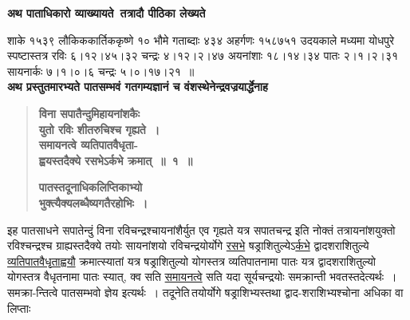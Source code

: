 \documentclass[11pt, openany]{book}
\begin{document}
{\small \textbf{अथ पाताधिकारो व्याख्यायते\textendash ~तत्रादौ पीठिका लेख्यते\textendash }}

\newpage

\begin{sloppypar}
शाके १५३९ लौकिककार्तिककृष्णे १० भौमे गताब्दाः ४३४ अहर्गणः १५८७५१ उदयकाले मध्यमा योधपुरे स्पष्टास्तत्र रविः ६।१२।४५।३२ चन्द्रः ४।१२।२।४७ अयनांशाः १८।१४।३४ पातः २।१।२।३१ सायनार्कः ७।१।०।६ चन्द्रः ५।०।१७।२१~॥\\

{\small \textbf{अथ प्रस्तुतमारभ्यते पातसम्भवं गतगम्यज्ञानं च वंशस्थेनेन्द्रवज्रयार्द्धेनाह\textendash }}

 \label{9.1}
\begin{quote}
{\large \textbf{{\color{purple}विना सपातैन्दुमिहायनांशकैः \\
युतो रविः शीतरुचिश्च गृह्यते~। \\
समायनत्वे व्यतिपातवैधृता-\\
ह्वयस्तदैक्ये रसभेऽर्कभे क्रमात्~॥~१~॥}}
\vspace{1mm}

 \label{9.2.1}
\textbf{{\color{purple}पातस्तदूनाधिकलिप्तिकाभ्यो \\
भुक्त्यैक्यलब्धैष्यगतैरहोभिः~।}}}
\end{quote}

इह पातसाधने सपातेन्दुं विना रविचन्द्रश्चायनांशैर्युत एव गृह्यते यत्र सपातचन्द्र इति नोक्तं तत्रायनांशयुक्तो रविश्चन्द्रश्च ग्राह्यस्तदैक्ये तयोः सायनांशयो रविचन्द्रयोर्योगे \hyperref[9.1]{रसभे} षड्राशितुल्येऽ\hyperref[9.1]{र्कभे} द्वादशराशितुल्ये \hyperref[9.1]{व्यतिपातवैधृताह्वयौ} क्रमात्स्यातां यत्र षड्राशितुल्यो योगस्तत्र व्यतिपातनामा पातः यत्र द्वादशराशितुल्यो योगस्तत्र वैधृतनामा पातः स्यात्, क्व सति \hyperref[9.1]{समायनत्वे} सति यदा सूर्यचन्द्रयोः समक्रान्ती भवतस्तदेत्यर्थः~। समक्रा-न्तित्वे पातसम्भवो ज्ञेय इत्यर्थः~। तदूनेति\textendash \,तयोर्योगे षड्राशिभ्यस्तथा द्वाद-शराशिभ्यश्चोना अधिका वा लिप्ताः
\end{sloppypar}

\newpage
\end{document}

